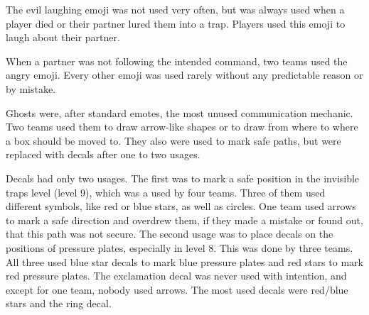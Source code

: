The evil laughing emoji was not used very often, but was always used when a player died or their partner lured them into a trap. Players used this emoji to laugh about their partner.

When a partner was not following the intended command, two teams used the angry emoji. Every other emoji was used rarely without any predictable reason or by mistake.

Ghosts were, after standard emotes, the most unused communication mechanic. Two teams used them to draw arrow-like shapes or to draw from where to where a box should be moved to. They also were used to mark safe paths, but were replaced with decals after one to two usages.

Decals had only two usages. The first was to mark a safe position in the invisible traps level (level 9), which was a used by four teams. Three of them used different symbols, like red or blue stars, as well as circles. One team used arrows to mark a safe direction and overdrew them, if they made a mistake or found out, that this path was not secure.
The second usage was to place decals on the positions of pressure plates, especially in level 8. This was done by three teams. All three used blue star decals to mark blue pressure plates and red stars to mark red pressure plates. The exclamation decal was never used with intention, and except for one team, nobody used arrows. The most used decals were red/blue stars and the ring decal.